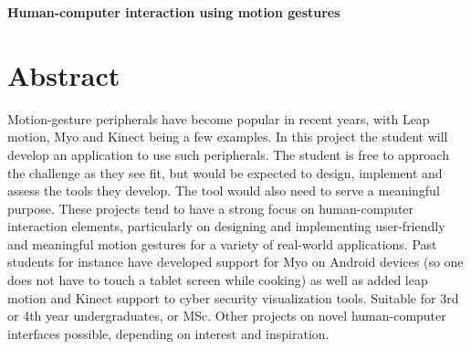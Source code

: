 \documentclass[]{article}
\begin{document}
\textbf{Human-computer interaction using motion gestures}
\section{Abstract}
Motion-gesture peripherals have become popular in recent years, with Leap motion, Myo and Kinect being a few examples. In this project the student will develop an application to use such peripherals. The student is free to approach the challenge as they see fit, but would be expected to design, implement and assess the tools they develop. The tool would also need to serve a meaningful purpose. These projects tend to have a strong focus on human-computer interaction elements, particularly on designing and implementing user-friendly and meaningful motion gestures for a variety of real-world applications. Past students for instance have developed support for Myo on Android devices (so one does not have to touch a tablet screen while cooking) as well as added leap motion and Kinect support to cyber security visualization tools. Suitable for 3rd or 4th year undergraduates, or MSc. Other projects on novel human-computer interfaces possible, depending on interest and inspiration.
\end{document}
